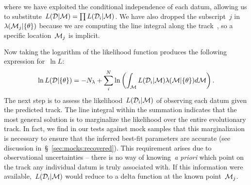\documentclass[foo.tex]{subfiles}
\begin{document}
where we have exploited the conditional independence of each datum, allowing us
to substitute~$L(\mathcal{D} | \mathcal{M}) = \prod L(\mathcal{D}_i |
\mathcal{M})$.
We have also dropped the subscript~$j$ in~$\lambda(\mathcal{M}_j | \{\theta\})$
because we are computing the line integral along the track~, so a
specific location~$\mathcal{M}_j$ is implicit.
\par
Now taking the logarithm of the likelihood function produces the following
expression for~$\ln L$:
\begin{equation}
\ln L(\mathcal{D} | \{\theta\}) = -N_\lambda + \sum_i^N \ln \left(
\int_{\mathcal{M}} L(\mathcal{D}_i | \mathcal{M})\lambda(\mathcal{M} | \{\theta\})
d\mathcal{M}
\right).
\label{eq:lnL_with_integral}
\end{equation}
The next step is to assess the likelihood~$L(\mathcal{D}_i | \mathcal{M})$ of
observing each datum given the predicted track.
The line integral within the summation indicates that the most general solution
is to marginalize the likelihood over the entire evolutionary track.
In fact, we find in our tests against mock samples that this marginalizaion is necessary to
ensure that the inferred best-fit parameters are accurate (see discussion
in~\S~\ref{sec:mocks:recovered}).
This requirement arises due to observational uncertainties -- there is no way
of knowing~\textit{a priori} which point on the track any individual datum is
truly associated with.
If this information were available,~$L(\mathcal{D}_i | \mathcal{M})$ would reduce
to a delta function at the known point~$\mathcal{M}_j$.
\end{document}
